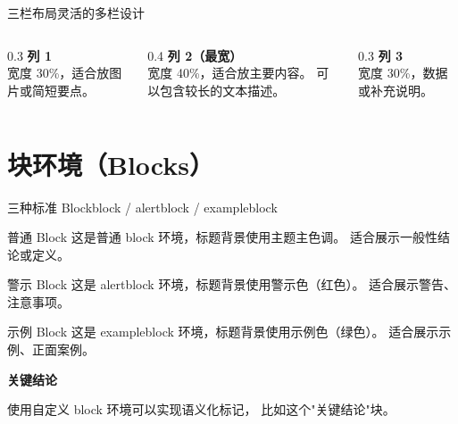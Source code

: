 \documentclass[UTF8,11pt,aspectratio=169]{beamer}
\newenvironment{keypoint}{
    \begin{block}{\textbf{\twemoji{key} 关键结论}}
}{
    \end{block}
}
\begin{document}
\begin{frame}{三栏布局}{灵活的多栏设计}
    \begin{columns}[T]
        \begin{column}{0.3\textwidth}
            \centering
            \textbf{列 1} \\
            \vspace{0.3cm}
            宽度 30\%，适合放图片或简短要点。
        \end{column}
        \begin{column}{0.4\textwidth}
            \centering
            \textbf{列 2（最宽）} \\
            \vspace{0.3cm}
            宽度 40\%，适合放主要内容。
            可以包含较长的文本描述。
        \end{column}
        \begin{column}{0.3\textwidth}
            \centering
            \textbf{列 3} \\
            \vspace{0.3cm}
            宽度 30\%，数据或补充说明。
        \end{column}
    \end{columns}
\end{frame}

\section{块环境（Blocks）}

\begin{frame}{三种标准 Block}{block / alertblock / exampleblock}

    \begin{block}{普通 Block}
        这是普通 block 环境，标题背景使用主题主色调。
        适合展示一般性结论或定义。
    \end{block}

    \begin{alertblock}{警示 Block}
        这是 alertblock 环境，标题背景使用警示色（红色）。
        适合展示警告、注意事项。
    \end{alertblock}

    \begin{exampleblock}{示例 Block}
        这是 exampleblock 环境，标题背景使用示例色（绿色）。
        适合展示示例、正面案例。
    \end{exampleblock}

    \begin{keypoint}
        使用自定义 block 环境可以实现语义化标记，
        比如这个"关键结论"块。
    \end{keypoint}
\end{frame}
\end{document}
